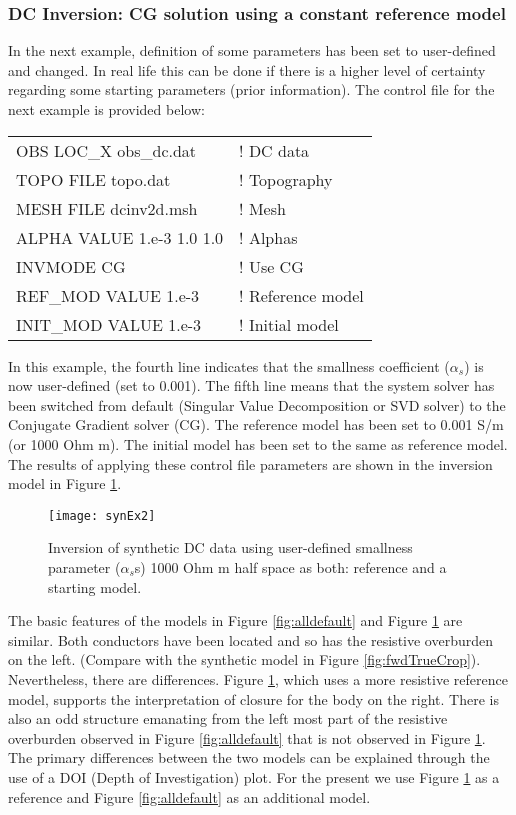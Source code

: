 \subsubsection{DC Inversion: CG solution using a constant reference model}
In the next example, definition of some parameters has been set to user-defined and changed. In real life this can be done if there is a higher level of certainty regarding some starting parameters (prior information). The control file for the next example is provided below:
%
\begin{fileExample}
\begin{tabular}{|ll|}
\hline
OBS LOC\_X obs\_dc.dat & ! DC data \\
TOPO FILE topo.dat & ! Topography\\
MESH FILE dcinv2d.msh & ! Mesh \\
ALPHA VALUE 1.e-3 1.0 1.0 & ! Alphas \\
INVMODE CG & ! Use CG \\
REF\_MOD VALUE 1.e-3 & ! Reference model \\
INIT\_MOD VALUE 1.e-3 & ! Initial model \\
\hline
\end{tabular}
\end{fileExample}
%
In this example, the fourth line indicates that the smallness coefficient ($\alpha_s$) is now user-defined (set to 0.001). The fifth line means that the system solver has been switched from default (Singular Value Decomposition or SVD solver) to the Conjugate Gradient solver (CG). The reference model has been set to 0.001 S/m (or 1000 Ohm m). The initial model has been set to the same as reference model. The results of applying these control file parameters are shown in the inversion model in Figure \ref{fig:synEx2}.
%
\begin{figure}
\centering
\texttt{[image: synEx2]}
\caption{Inversion of synthetic DC data using user-defined smallness parameter ($\alpha_s$s) 1000 Ohm m half space as both: reference and a starting model.}
\label{fig:synEx2}
\end{figure}

The basic features of the models in Figure \ref{fig:alldefault} and Figure \ref{fig:synEx2} are similar. Both conductors have been located and so has the resistive overburden on the left. (Compare with the synthetic model in Figure \ref{fig:fwdTrueCrop}). Nevertheless, there are differences. Figure \ref{fig:synEx2}, which uses a more resistive reference model, supports the interpretation of closure for the body on the right. There is also an odd structure emanating from the left most part of the resistive overburden observed in Figure \ref{fig:alldefault} that is not observed in Figure \ref{fig:synEx2}. The primary differences between the two models can be explained through the use of a DOI (Depth of Investigation) plot. For the present we use Figure \ref{fig:synEx2} as a reference and Figure \ref{fig:alldefault} as an additional model. 

